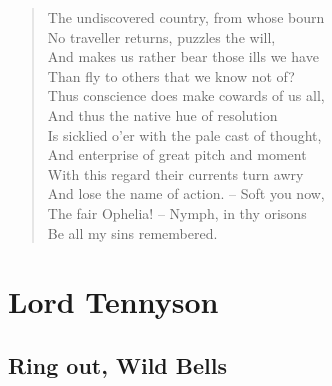 \documentclass[10pt,a5paper,oneside]{book}
\begin{document}
\begin{verse}
The undiscovered country, from whose bourn\\
No traveller returns, puzzles the will,\\
And makes us rather bear those ills we have\\
Than fly to others that we know not of?\\
Thus conscience does make cowards of us all,\\
And thus the native hue of resolution\\
Is sicklied o'er with the pale cast of thought,\\
And enterprise of great pitch and moment\\
With this regard their currents turn awry\\
And lose the name of action. -- Soft you now,\\
The fair Ophelia! -- Nymph, in thy orisons\\
Be all my sins remembered.
\end{verse}

\part{Lord Tennyson}

\chapter{Ring out, Wild Bells}
\end{document}
